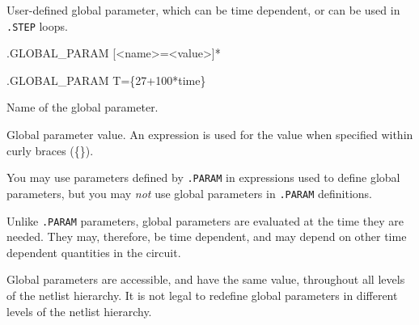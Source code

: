 


User-defined global parameter, which can be time dependent, or can be used in \texttt{.STEP} loops.

\begin{Command}

\format
.GLOBAL\_PARAM [<name>=<value>]*

\examples
.GLOBAL\_PARAM T=\{27+100*time\}

\begin{Arguments}
Name of the global parameter.

Global parameter value.  An expression is used for the value when specified within curly braces (\{\}).

\end{Arguments}

\comments

You may use parameters defined by \texttt{.PARAM} in expressions used to
define global parameters, but you may {\em not} use global parameters in
\texttt{.PARAM} definitions.

Unlike \texttt{.PARAM} parameters, global parameters are evaluated at
the time they are needed. They may, therefore, be time dependent, and may
depend on other time dependent quantities in the circuit.

Global parameters are accessible, and have the same value, throughout all
levels of the netlist hierarchy.  It is not legal to redefine global parameters
in different levels of the netlist hierarchy.

\end{Command}
